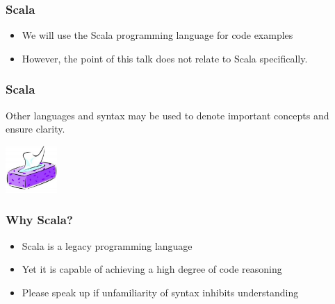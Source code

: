 \begin{frame}
\frametitle{Scala}
\begin{itemize}
  \item We will use the Scala programming language for code examples
  \item However, the point of this talk does not relate to Scala specifically.
\end{itemize}
\end{frame}

\begin{frame}
\frametitle{Scala}
\begin{center}
Other languages and syntax may be used to denote important concepts and ensure clarity.
\end{center}
\begin{center}
\includegraphics[height=1.8cm]{image/tissues.jpg}
\end{center}
\end{frame}

\begin{frame}
\frametitle{Why Scala?}
\begin{itemize}
  \item Scala is a legacy programming language
  \item Yet it is capable of achieving a high degree of code reasoning
  \item Please speak up if unfamiliarity of syntax inhibits understanding
\end{itemize}
\end{frame}

